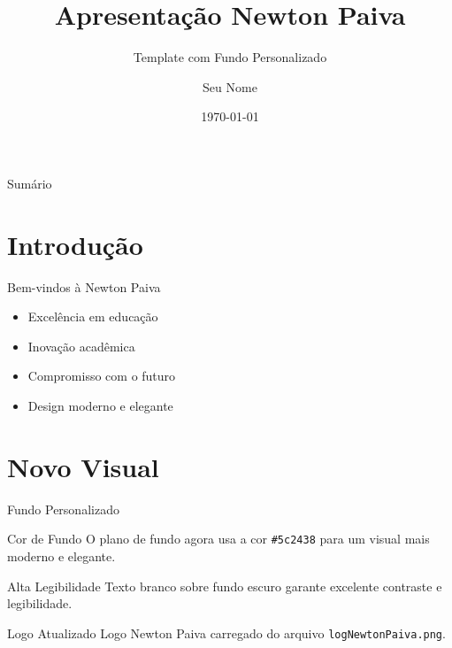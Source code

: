 \documentclass{beamer}
\title{Apresentação Newton Paiva}
\subtitle{Template com Fundo Personalizado}
\author{Seu Nome}
\institute{Centro Universitário Newton Paiva}
\date{\today}
\begin{document}
\begin{frame}
    \titlepage
\end{frame}

\begin{frame}{Sumário}
    \tableofcontents
\end{frame}

\section{Introdução}
\begin{frame}{Bem-vindos à Newton Paiva}
    \begin{itemize}
        \item Excelência em educação
        \item Inovação acadêmica
        \item Compromisso com o futuro
        \item Design moderno e elegante
    \end{itemize}
    
    \vspace{1cm}
    \begin{center}
        \newtonlogo[1.5cm]
    \end{center}
\end{frame}

\section{Novo Visual}
\begin{frame}{Fundo Personalizado}
    \begin{block}{Cor de Fundo}
        O plano de fundo agora usa a cor \texttt{\#5c2438} para um visual mais moderno e elegante.
    \end{block}
    
    \begin{alertblock}{Alta Legibilidade}
        Texto branco sobre fundo escuro garante excelente contraste e legibilidade.
    \end{alertblock}
    
    \begin{exampleblock}{Logo Atualizado}
        Logo Newton Paiva carregado do arquivo \texttt{logNewtonPaiva.png}.
    \end{exampleblock}
\end{frame}
\end{document}
